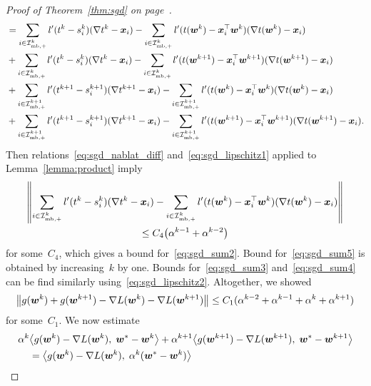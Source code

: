 \begin{proof}[Proof of Theorem~\ref{thm:sgd} on page~\pageref{thm:sgd}]
\begin{subequations}
\begin{align}
    \label{eq:sgd_sum2}
    & = \sum_{i \in \mathcal{I}_{\text{mb},+}^k} l'(t^k - s_i^k)(\nabla t^k - \bm{x}_i) - \sum_{i \in \mathcal{I}_{\text{mb},+}^k} l'(t(\bm{w}^k) - \bm{x}_i^\top \bm{w}^k)(\nabla t(\bm{w}^k) - \bm{x}_i) \\
    \label{eq:sgd_sum3}
    & + \sum_{i \in \mathcal{I}_{\text{mb},+}^k} l'(t^k - s_i^k)(\nabla t^k - \bm{x}_i) - \sum_{i \in \mathcal{I}_{\text{mb},+}^k} l'(t(\bm{w}^{k+1}) - \bm{x}_i^\top \bm{w}^{k+1})(\nabla t(\bm{w}^{k+1}) - \bm{x}_i)\\
    \label{eq:sgd_sum4}
    & + \sum_{i \in \mathcal{I}_{\text{mb},+}^{k+1}} l'(t^{k+1} - s_i^{k+1})(\nabla t^{k+1} - \bm{x}_i) - \sum_{i\in \mathcal{I}_{\text{mb},+}^{k+1}}l'(t(\bm{w}^k) - \bm{x}_i^\top \bm{w}^k)(\nabla t(\bm{w}^k) - \bm{x}_i) \\
    \label{eq:sgd_sum5}
    & + \sum_{i \in \mathcal{I}_{\text{mb},+}^{k+1}} l'(t^{k+1} - s_i^{k+1})(\nabla t^{k+1} - \bm{x}_i)  - \sum_{i \in \mathcal{I}_{\text{mb},+}^{k+1}} l'(t(\bm{w}^{k+1}) - \bm{x}_i^\top \bm{w}^{k+1})(\nabla t(\bm{w}^{k+1}) - \bm{x}_i).
    \end{align}
  \end{subequations}
  Then relations~\eqref{eq:sgd_nablat_diff} and~\eqref{eq:sgd_lipschitz1} applied to Lemma~\ref{lemma:product} imply
  \begin{multline*}
    \norm{\sum_{i \in \Imbpos^k} l'(t^k - s_i^k)(\nabla t^k - \bm{x}_i) - \sum_{i \in \Imbpos^k} l'(t(\bm{w}^k) - \bm{x}_i^\top \bm{w}^k)(\nabla t(\bm{w}^k) - \bm{x}_i)}\\
      \leq C_4 \Brac{\alpha^{k-1} + \alpha^{k-2}}
  \end{multline*}
  for some~$C_4$, which gives a bound for~\eqref{eq:sgd_sum2}. Bound for~\eqref{eq:sgd_sum5} is obtained by increasing~$k$ by one. Bounds for~\eqref{eq:sgd_sum3} and~\eqref{eq:sgd_sum4} can be find similarly using~\eqref{eq:sgd_lipschitz2}. Altogether, we showed
  \begin{equation}\label{eq:nec_cond3}
    \norm{g(\bm{w}^k) + g(\bm{w}^{k+1}) - \nabla L(\bm{w}^k) - \nabla L(\bm{w}^{k+1})}
      \leq C_1(\alpha^{k-2} + \alpha^{k-1} + \alpha^{k} + \alpha^{k+1})
  \end{equation}
  for some~$C_1$. We now estimate
  \begin{equation}\label{eq:proof_est1}
    \begin{aligned}
      \alpha^k
      & \inner{ g(\bm{w}^{k})-\nabla L(\bm{w}^{k})}{\bm{w}^*-\bm{w}^{k}} + \alpha^{k+1}\inner{ g(\bm{w}^{k+1})-\nabla L(\bm{w}^{k+1})}{\bm{w}^*-\bm{w}^{k+1}} \\
      & = \inner{ g(\bm{w}^{k})-\nabla L(\bm{w}^{k})}{\alpha^k(\bm{w}^*-\bm{w}^{k})}

\end{aligned}
\end{equation}
\end{proof}
